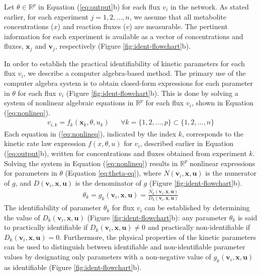 \documentclass[10pt]{article}
\begin{document}
	Let $\theta \in \mathbb{R}^p$ in Equation (\ref{eq:output}b) for each flux $v_i$ in the network. As stated earlier, for each experiment $j = {1, 2, ..., n}$, we assume that all metabolite concentrations ($x$) and reaction fluxes ($v$) are measurable. The pertinent information for each experiment is available as a vector of concentrations and fluxes, $\mathbf{x}_j$ and $\mathbf{v}_j$, respectively (Figure \ref{fig:ident-flowchart}b). 
	
	In order to establish the practical identifiability of kinetic parameters for each flux $v_i$, we describe a computer algebra-based method. The primary use of the computer algebra system is to obtain closed-form expressions for each parameter in $\theta$ for each flux $v_i$ (Figure \ref{fig:ident-flowchart}b). This is done by solving a system of nonlinear algebraic equations in $\mathbb{R}^p$ for each flux $v_i$, shown in Equation (\ref{eq:nonlineq}).
	\begin{align}\label{eq:nonlineq}
	v_{i, k} = f_k(\mathbf{x}_k,\theta, u_k) && \forall k=\{1, 2, ..., p\}\subset\{1, 2, ..., n\}
	\end{align}
	Each equation in (\ref{eq:nonlineq}), indicated by the index $k$, corresponds to the kinetic rate law expression $f(x, \theta, u)$ for $v_i$, described earlier in Equation (\ref{eq:output}b), written for concentrations and fluxes obtained from experiment $k$. Solving the system in Equation (\ref{eq:nonlineq}) results in $\mathbb{R}^p$ nonlinear expressions for parameters in $\theta$ (Equation \ref{eq:theta-eq}), where $N(\mathbf{v}_i, \mathbf{x}, \mathbf{u})$ is the numerator of $g$, and $D(\mathbf{v}_i, \mathbf{x}, \mathbf{u})$ is the denominator of $g$ (Figure \ref{fig:ident-flowchart}b).
	\begin{align}\label{eq:theta-eq}
	\theta_k = g_k(\mathbf{v}_i, \mathbf{x}, \mathbf{u}) = \frac{N_k(\mathbf{v}_i, \mathbf{x}, \mathbf{u})}{D_k(\mathbf{v}_i, \mathbf{x}, \mathbf{u})}
	\end{align}
	The identifiability of parameter $\theta_k$ for flux $v_i$ can be established by determining the value of $D_k(\mathbf{v}_i, \mathbf{x}, \mathbf{u})$ (Figure \ref{fig:ident-flowchart}b): any parameter $\theta_k$ is said to practically identifiable if $D_k(\mathbf{v}_i, \mathbf{x}, \mathbf{u})\neq0$ and practically non-identifiable if $D_k(\mathbf{v}_i, \mathbf{x}, \mathbf{u}) = 0$. Furthermore, the physical properties of the kinetic parameters can be used to distinguish between identifiable and non-identifiable parameter values by designating only parameters with a non-negative value of $g_k(\mathbf{v}_i, \mathbf{x}, \mathbf{u})$ as identifiable (Figure \ref{fig:ident-flowchart}b).
	
\end{document}
